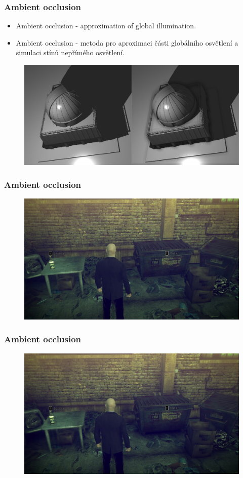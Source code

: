 \begin{frame}\frametitle{Ambient occlusion}
  \begin{itemize}
    \item Ambient occlusion - approximation of global illumination.
    \item Ambient occlusion - metoda pro aproximaci části globálního osvětlení a simulaci stínů nepřímého osvětlení.
  \end{itemize}
  \begin{figure}[h]
    \includegraphics[width=11.5cm,keepaspectratio]{pics/shadows/ambientOcclusion/difference}
  \end{figure}
\end{frame}

\begin{frame}\frametitle{Ambient occlusion}
  \begin{figure}[h]
    \includegraphics[width=11.5cm,keepaspectratio]{pics/shadows/ambientOcclusion/hitman}
  \end{figure}
\end{frame}

\begin{frame}\frametitle{Ambient occlusion}
  \begin{figure}[h]
    \includegraphics[width=11.5cm,keepaspectratio]{pics/shadows/ambientOcclusion/hitmanssao}
  \end{figure}
\end{frame}

